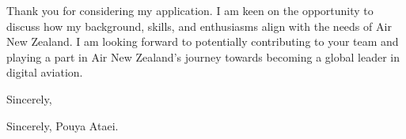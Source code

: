 \documentclass[10pt,a4paper,ragged2e]{altacv}
\begin{document}
\vspace{1em}

Thank you for considering my application. I am keen on the opportunity to discuss how my background, skills, and enthusiasms align with the needs of Air New Zealand. I am looking forward to potentially contributing to your team and playing a part in Air New Zealand's journey towards becoming a global leader in digital aviation.

\vspace{1em}

Sincerely,


\vspace{2em} %

Sincerely, \newline
Pouya Ataei.
\end{document}
